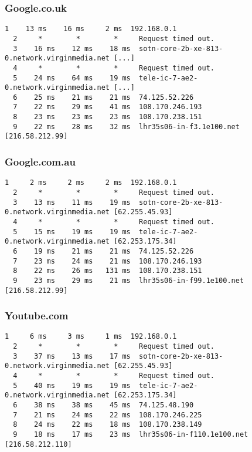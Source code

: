 \subsubsection{Google.co.uk}
\begin{lstlisting}[breaklines, frame=single, basicstyle=\footnotesize, tabsize=2, numberstyle=\footnotesize]
  1    13 ms    16 ms     2 ms  192.168.0.1
  2     *        *        *     Request timed out.
  3    16 ms    12 ms    18 ms  sotn-core-2b-xe-813-0.network.virginmedia.net [...]
  4     *        *        *     Request timed out.
  5    24 ms    64 ms    19 ms  tele-ic-7-ae2-0.network.virginmedia.net [...]
  6    25 ms    21 ms    21 ms  74.125.52.226
  7    22 ms    29 ms    41 ms  108.170.246.193
  8    23 ms    23 ms    23 ms  108.170.238.151
  9    22 ms    28 ms    32 ms  lhr35s06-in-f3.1e100.net [216.58.212.99]  
\end{lstlisting}
\newpage
\subsubsection{Google.com.au}
\begin{lstlisting}[breaklines, frame=single, basicstyle=\footnotesize, tabsize=2, numberstyle=\footnotesize]
  1     2 ms     2 ms     2 ms  192.168.0.1
  2     *        *        *     Request timed out.
  3    13 ms    11 ms    19 ms  sotn-core-2b-xe-813-0.network.virginmedia.net [62.255.45.93]
  4     *        *        *     Request timed out.
  5    15 ms    19 ms    19 ms  tele-ic-7-ae2-0.network.virginmedia.net [62.253.175.34]
  6    19 ms    21 ms    21 ms  74.125.52.226
  7    23 ms    24 ms    21 ms  108.170.246.193
  8    22 ms    26 ms   131 ms  108.170.238.151
  9    23 ms    29 ms    21 ms  lhr35s06-in-f99.1e100.net [216.58.212.99]
\end{lstlisting}

\subsubsection{Youtube.com}
\begin{lstlisting}[breaklines, frame=single, basicstyle=\footnotesize, tabsize=2, numberstyle=\footnotesize]
  1     6 ms     3 ms     1 ms  192.168.0.1
  2     *        *        *     Request timed out.
  3    37 ms    13 ms    17 ms  sotn-core-2b-xe-813-0.network.virginmedia.net [62.255.45.93]
  4     *        *        *     Request timed out.
  5    40 ms    19 ms    19 ms  tele-ic-7-ae2-0.network.virginmedia.net [62.253.175.34]
  6    38 ms    38 ms    45 ms  74.125.48.190
  7    21 ms    24 ms    22 ms  108.170.246.225
  8    24 ms    22 ms    18 ms  108.170.238.149
  9    18 ms    17 ms    23 ms  lhr35s06-in-f110.1e100.net [216.58.212.110]
\end{lstlisting}